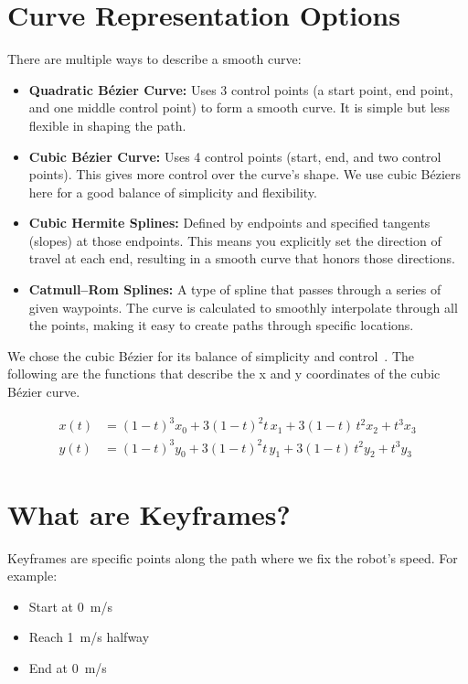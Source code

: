 \documentclass[11pt]{article}
\begin{document}
\section{Curve Representation Options}

There are multiple ways to describe a smooth curve:

\begin{itemize}
  \item \textbf{Quadratic Bézier Curve:} Uses 3 control points (a start point, end point, and one middle control point) to form a smooth curve. It is simple but less flexible in shaping the path.
  \item \textbf{Cubic Bézier Curve:} Uses 4 control points (start, end, and two control points). This gives more control over the curve's shape. We use cubic Béziers here for a good balance of simplicity and flexibility.
  \item \textbf{Cubic Hermite Splines:} Defined by endpoints and specified tangents (slopes) at those endpoints. This means you explicitly set the direction of travel at each end, resulting in a smooth curve that honors those directions.
  \item \textbf{Catmull--Rom Splines:} A type of spline that passes through a series of given waypoints. The curve is calculated to smoothly interpolate through all the points, making it easy to create paths through specific locations.
\end{itemize}

We chose the cubic B\'ezier for its balance of simplicity and control~\cite{farin}. The following are the functions that describe the x and y coordinates of the cubic B\'ezier curve.

\[
\begin{aligned}
x(t) &= (1 - t)^3 x_0 + 3(1 - t)^2 t\, x_1 + 3(1 - t)\, t^2 x_2 + t^3 x_3 \\
y(t) &= (1 - t)^3 y_0 + 3(1 - t)^2 t\, y_1 + 3(1 - t)\, t^2 y_2 + t^3 y_3
\end{aligned}
\]

\section{What are Keyframes?}

Keyframes are specific points along the path where we fix the robot’s speed. For example:

\begin{itemize}
  \item Start at 0~m/s
  \item Reach 1~m/s halfway
  \item End at 0~m/s
\end{itemize}
\end{document}
